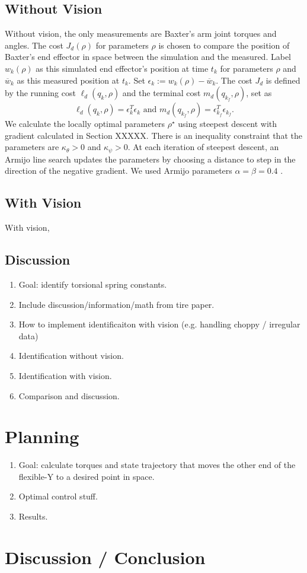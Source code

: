 \documentclass[runningheads,a4paper]{llncs}
\begin{document}
\subsection{Without Vision}
Without vision, the only measurements are Baxter's arm joint torques and angles.  The cost $J_d(\rho)$ for parameters $\rho$ is chosen to compare the position of Baxter's end effector in space between the simulation and the measured.  Label $w_k(\rho)$ as this simulated end effector's position at time $t_k$ for parameters $\rho$ and $\overline{w}_k$ as this measured position at $t_k$.  Set $\epsilon_k := w_k(\rho)-\overline{w}_k$.  The cost $J_d$ is defined by the running cost $\ell_d(q_k,\rho)$ and the terminal cost $m_d(q_{k_f},\rho)$, set as
\[
\ell_d(q_k,\rho) = \epsilon_k^T\epsilon_k \textrm{ and } m_d(q_{k_f},\rho) = \epsilon_{k_f}^T\epsilon_{k_f}.
\]
We calculate the locally optimal parameters $\rho^\star$ using steepest descent with gradient calculated in Section XXXXX. There is an inequality constraint that the parameters are $\kappa_\theta>0$ and $\kappa_\psi>0$.    At each iteration of steepest descent, an Armijo line search updates the parameters by choosing a distance to step in the direction of the negative gradient.  We used Armijo parameters $\alpha = \beta = 0.4$ \cite{armijo}.

\subsection{With Vision}
With vision, 

\subsection{Discussion}

\begin{enumerate}
\item Goal: identify torsional spring constants.
\item Include discussion/information/math from tire paper.
\item How to implement identificaiton with vision (e.g. handling choppy / irregular data)
\item Identification without vision.
\item Identification with vision.
\item Comparison and discussion.
\end{enumerate}

\section{Planning}
\begin{enumerate}
\item Goal: calculate torques and state trajectory that moves the other end of the flexible-Y to a desired point in space.
\item Optimal control stuff.
\item Results.
\end{enumerate}

\section{Discussion / Conclusion}




\end{document}
